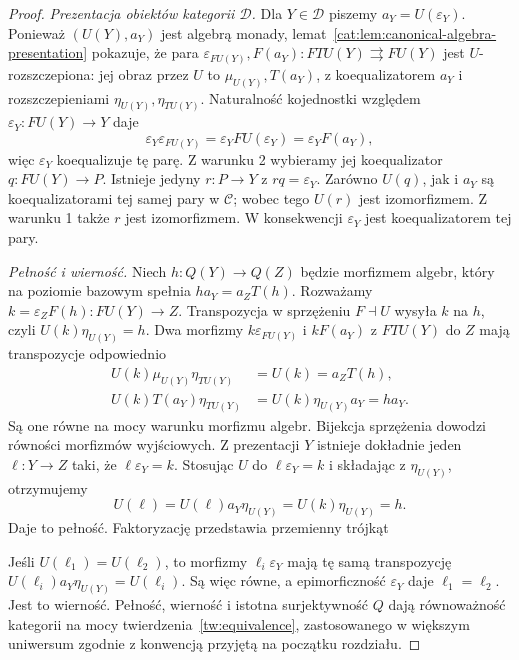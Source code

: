 \begin{proof}
\emph{Prezentacja obiektów kategorii $\mathcal D$.}
Dla $Y\in\mathcal D$ piszemy $a_Y=U(\varepsilon_Y)$.
Ponieważ $(U(Y),a_Y)$ jest algebrą monady, lemat~\ref{cat:lem:canonical-algebra-presentation} pokazuje, że para $\varepsilon_{FU(Y)},F(a_Y):FTU(Y)\rightrightarrows FU(Y)$ jest $U$-rozszczepiona: jej obraz przez $U$ to $\mu_{U(Y)},T(a_Y)$, z koequalizatorem $a_Y$ i rozszczepieniami $\eta_{U(Y)},\eta_{TU(Y)}$. Naturalność kojednostki względem $\varepsilon_Y:FU(Y)\to Y$ daje
\[
 \varepsilon_Y\varepsilon_{FU(Y)}
 =\varepsilon_Y FU(\varepsilon_Y)=\varepsilon_Y F(a_Y),
\]
więc $\varepsilon_Y$ koequalizuje tę parę. Z warunku 2 wybieramy jej koequalizator $q:FU(Y)\to P$. Istnieje jedyny $r:P\to Y$ z $rq=\varepsilon_Y$. Zarówno $U(q)$, jak i $a_Y$ są koequalizatorami tej samej pary w $\mathcal C$; wobec tego $U(r)$ jest izomorfizmem. Z warunku 1 także $r$ jest izomorfizmem. W konsekwencji $\varepsilon_Y$ jest koequalizatorem tej pary.

\emph{Pełność i wierność.}
Niech $h:Q(Y)\to Q(Z)$ będzie morfizmem algebr, który na poziomie bazowym spełnia $ha_Y=a_ZT(h)$. Rozważamy $k=\varepsilon_ZF(h):FU(Y)\to Z$. Transpozycja w sprzężeniu $F\dashv U$ wysyła $k$ na $h$, czyli $U(k)\eta_{U(Y)}=h$.
Dwa morfizmy $k\varepsilon_{FU(Y)}$ i $kF(a_Y)$ z $FTU(Y)$ do $Z$ mają transpozycje odpowiednio
\begin{align*}
 U(k)\mu_{U(Y)}\eta_{TU(Y)}&=U(k)=a_ZT(h),\\
 U(k)T(a_Y)\eta_{TU(Y)}&=U(k)\eta_{U(Y)}a_Y=ha_Y.
\end{align*}
Są one równe na mocy warunku morfizmu algebr. Bijekcja sprzężenia dowodzi równości morfizmów wyjściowych. Z prezentacji $Y$ istnieje dokładnie jeden $\ell:Y\to Z$ taki, że $\ell\varepsilon_Y=k$. Stosując $U$ do $\ell\varepsilon_Y=k$ i składając z $\eta_{U(Y)}$, otrzymujemy
\[
 U(\ell)=U(\ell)a_Y\eta_{U(Y)}=U(k)\eta_{U(Y)}=h.
\]
Daje to pełność. Faktoryzację przedstawia przemienny trójkąt
\begin{center}
\end{center}
Jeśli $U(\ell_1)=U(\ell_2)$, to morfizmy $\ell_i\varepsilon_Y$ mają tę samą transpozycję $U(\ell_i)a_Y\eta_{U(Y)}=U(\ell_i)$. Są więc równe, a epimorficzność $\varepsilon_Y$ daje $\ell_1=\ell_2$. Jest to wierność. Pełność, wierność i istotna surjektywność $Q$ dają równoważność kategorii na mocy twierdzenia~\ref{tw:equivalence}, zastosowanego w większym uniwersum zgodnie z konwencją przyjętą na początku rozdziału.
\end{proof}

